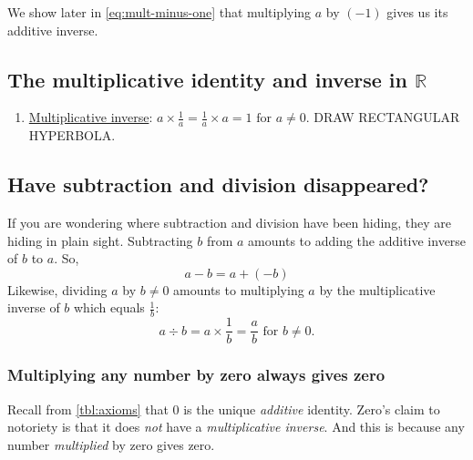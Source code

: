 \documentclass[
  a4paper,
]{article}
\providecommand{\tightlist}{%
  \setlength{\itemsep}{0pt}\setlength{\parskip}{0pt}}
\begin{document}
We show later in \cref{eq:mult-minus-one} that multiplying \(a\) by
\((-1)\) gives us its additive inverse.

\hypertarget{the-multiplicative-identity-and-inverse-in-mathbbr}{%
\subsection{\texorpdfstring{The multiplicative identity and inverse in
\(\mathbb{R}\)}{The multiplicative identity and inverse in \textbackslash mathbb\{R\}}}\label{the-multiplicative-identity-and-inverse-in-mathbbr}}

\begin{enumerate}
\tightlist
\item
  \href{https://mathworld.wolfram.com/MultiplicativeInverse.html}{Multiplicative
  inverse}:
  \(a \times \frac{1}{a} = \frac{1}{a} \times a = 1 \mbox{ for } a \ne 0\).
  DRAW RECTANGULAR HYPERBOLA.
\end{enumerate}

\hypertarget{have-subtraction-and-division-disappeared}{%
\subsection{Have subtraction and division
disappeared?}\label{have-subtraction-and-division-disappeared}}

If you are wondering where subtraction and division have been hiding,
they are hiding in plain sight. Subtracting \(b\) from \(a\) amounts to
adding the additive inverse of \(b\) to \(a\). So, \[
a - b = a + (-b)
\] Likewise, dividing \(a\) by \(b \ne 0\) amounts to multiplying \(a\)
by the multiplicative inverse of \(b\) which equals \(\frac{1}{b}\): \[
a \div b = a \times \frac{1}{b} = \frac{a}{b} \mbox{ for } b \ne 0.
\]

\hypertarget{multiplying-any-number-by-zero-always-gives-zero}{%
\subsubsection{Multiplying any number by zero always gives
zero}\label{multiplying-any-number-by-zero-always-gives-zero}}

Recall from \cref{tbl:axioms} that \(0\) is the unique \emph{additive}
identity. Zero's claim to notoriety is that it does \emph{not} have a
\emph{multiplicative inverse}. And this is because any number
\emph{multiplied} by zero gives zero.
\end{document}
